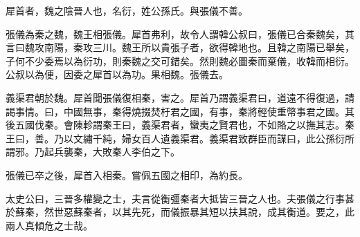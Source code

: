 犀首者，魏之陰晉人也，名衍，姓公孫氏。與張儀不善。

張儀為秦之魏，魏王相張儀。犀首弗利，故令人謂韓公叔曰，張儀已合秦魏矣，其言曰魏攻南陽，秦攻三川。魏王所以貴張子者，欲得韓地也。且韓之南陽已舉矣，子何不少委焉以為衍功，則秦魏之交可錯矣。然則魏必圖秦而棄儀，收韓而相衍。公叔以為便，因委之犀首以為功。果相魏。張儀去。

義渠君朝於魏。犀首聞張儀復相秦，害之。犀首乃謂義渠君曰，道遠不得復過，請謁事情。曰，中國無事，秦得燒掇焚杅君之國，有事，秦將輕使重幣事君之國。其後五國伐秦。會陳軫謂秦王曰，義渠君者，蠻夷之賢君也，不如賂之以撫其志。秦王曰，善。乃以文繡千純，婦女百人遺義渠君。義渠君致群臣而謀曰，此公孫衍所謂邪。乃起兵襲秦，大敗秦人李伯之下。

張儀已卒之後，犀首入相秦。嘗佩五國之相印，為約長。

太史公曰，三晉多權變之士，夫言從衡彊秦者大抵皆三晉之人也。夫張儀之行事甚於蘇秦，然世惡蘇秦者，以其先死，而儀振暴其短以扶其說，成其衡道。要之，此兩人真傾危之士哉。